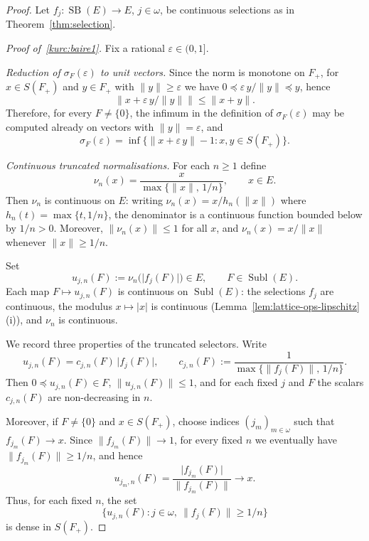 \documentclass[12pt]{amsart}
\renewcommand{\le}{\leqslant}
\renewcommand{\ge}{\geqslant}
\theoremstyle{plain}
\theoremstyle{definition}
\theoremstyle{remark}
\DeclareMathOperator{\SB}{SB}
\DeclareMathOperator{\Subl}{Subl}
\begin{document}
\begin{proof}
Let $f_j \colon \SB(E) \to E$, $j \in \omega$, be continuous selections as in
Theorem~\ref{thm:selection}.

\medskip
\emph{Proof of~\ref{kurc:baire1}.}
Fix a rational $\varepsilon \in (0, 1]$.

\smallskip
\emph{Reduction of $\sigma_F(\varepsilon)$ to unit vectors.}
Since the norm is monotone on $F_+$, for $x \in S(F_+)$ and $y \in F_+$ with
$\lVert y \rVert \ge \varepsilon$ we have
$0 \preceq \varepsilon\, y / \lVert y \rVert \preceq y$, hence
\[
    \lVert x + \varepsilon\, y / \lVert y \rVert \rVert
    \le \lVert x + y \rVert.
\]
Therefore, for every $F \ne \{0\}$, the infimum in the definition of
$\sigma_F(\varepsilon)$ may be
computed already on vectors with $\lVert y \rVert = \varepsilon$, and
\begin{equation}\label{eq:sigma-unit-reduction}
    \sigma_F(\varepsilon)
    = \inf\bigl\{\lVert x + \varepsilon\, y \rVert - 1
      \colon x, y \in S(F_+)\bigr\}.
\end{equation}

\smallskip
\emph{Continuous truncated normalisations.}
For each $n \ge 1$ define
\[
    \nu_n(x) = \frac{x}{\max\{\lVert x \rVert,\, 1/n\}}, \qquad x \in E.
\]
Then $\nu_n$ is continuous on $E$: writing
$\nu_n(x) = x / h_n(\lVert x \rVert)$ where $h_n(t) = \max\{t, 1/n\}$, the
denominator is a continuous function bounded below by $1/n > 0$.  Moreover,
$\lVert \nu_n(x) \rVert \le 1$ for all $x$, and
$\nu_n(x) = x / \lVert x \rVert$ whenever $\lVert x \rVert \ge 1/n$.

Set
\[
    u_{j,n}(F) := \nu_n\bigl(\lvert f_j(F) \rvert\bigr) \in E, \qquad
    F \in \Subl(E).
\]
Each map $F \mapsto u_{j,n}(F)$ is continuous on $\Subl(E)$: the selections
$f_j$ are continuous, the modulus
$x \mapsto \lvert x \rvert$ is continuous
(Lemma~\ref{lem:lattice-ops-lipschitz}\,(i)), and $\nu_n$ is continuous.

We record three properties of the truncated selectors.
Write
\[
    u_{j,n}(F)=c_{j,n}(F)\,\lvert f_j(F)\rvert,
    \qquad
    c_{j,n}(F):=\frac{1}{\max\{\lVert f_j(F)\rVert,\,1/n\}}.
\]
Then $0 \preceq u_{j,n}(F)\in F$, $\lVert u_{j,n}(F)\rVert\le 1$, and for each
fixed $j$ and $F$ the scalars $c_{j,n}(F)$ are non-decreasing in $n$.

Moreover, if $F\ne\{0\}$ and $x\in S(F_+)$, choose indices $(j_m)_{m\in\omega}$
such that $f_{j_m}(F)\to x$. Since $\lVert f_{j_m}(F)\rVert\to 1$, for every fixed
$n$ we eventually have $\lVert f_{j_m}(F)\rVert\ge 1/n$, and hence
\[
    u_{j_m,n}(F)
    = \frac{\lvert f_{j_m}(F)\rvert}{\lVert f_{j_m}(F)\rVert}
    \longrightarrow x.
\]
Thus, for each fixed $n$, the set
\[
    \{u_{j,n}(F)\colon j\in\omega,\ \lVert f_j(F)\rVert\ge 1/n\}
\]
is dense in $S(F_+)$.


\end{proof}
\end{document}
